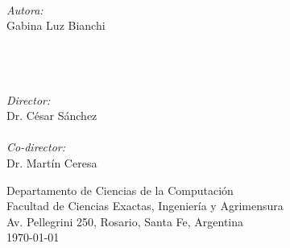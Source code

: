 {\begin{center}
    \HRule \\[0.4cm] %
    \noindent
    \begin{minipage}{0.4\textwidth}
        \begin{flushleft} \large
            \emph{Autora:}\\
            Gabina Luz Bianchi \\\ \\\ \\\ \\
        \end{flushleft}
        \end{minipage}%
        \begin{minipage}{0.4\textwidth}
        \begin{flushright} \large
            \emph{Director:} \\
            Dr. César Sánchez\\
            \ \\
            \emph{Co-director:} \\
            Dr. Martín Ceresa\\
        \end{flushright}
    \end{minipage}

\vfill

Departamento de Ciencias de la Computaci\'on\\
Facultad de Ciencias Exactas, Ingenier\'ia y Agrimensura\\
Av. Pellegrini 250, Rosario, Santa Fe, Argentina\\[0.4cm]
{\large \today}

\end{center}
\clearpage
}